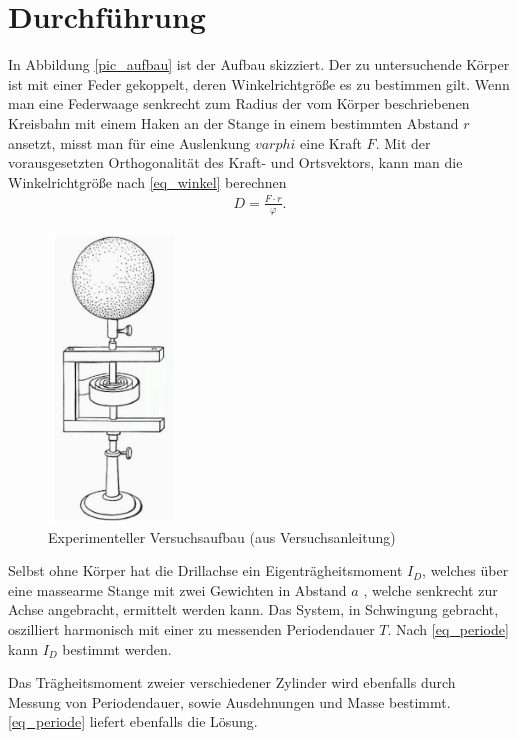 \section{Durchführung}
In Abbildung \eqref{pic_aufbau} ist der Aufbau skizziert. Der zu untersuchende Körper ist mit einer Feder gekoppelt, deren Winkelrichtgröße
es zu bestimmen gilt. Wenn man eine Federwaage senkrecht zum Radius der vom Körper beschriebenen Kreisbahn mit einem Haken an der Stange
in einem bestimmten Abstand $r$ ansetzt, misst man für eine Auslenkung $varphi$ eine Kraft $F$. Mit der vorausgesetzten Orthogonalität
des Kraft- und Ortsvektors, kann man die Winkelrichtgröße nach \eqref{eq_winkel} berechnen
\begin{align}
 D = \frac{F\cdot r}{\varphi}.
\end{align}

\begin{figure}[H]
 \includegraphics[width=0.3\textwidth]{pics/aufbau.png}
 \caption{Experimenteller Versuchsaufbau (aus Versuchsanleitung)}
 \label{pic_aufbau}
\end{figure}

Selbst ohne Körper hat die Drillachse ein Eigenträgheitsmoment $I_D$, welches über eine massearme Stange mit zwei Gewichten in Abstand $a$
, welche senkrecht zur Achse angebracht, ermittelt werden kann. Das System, in Schwingung gebracht, oszilliert harmonisch mit einer 
zu messenden Periodendauer $T$. Nach \eqref{eq_periode} kann $I_D$ bestimmt werden.

Das Trägheitsmoment zweier verschiedener Zylinder wird ebenfalls durch Messung von Periodendauer, sowie Ausdehnungen und Masse bestimmt.
\eqref{eq_periode} liefert ebenfalls die Lösung.

